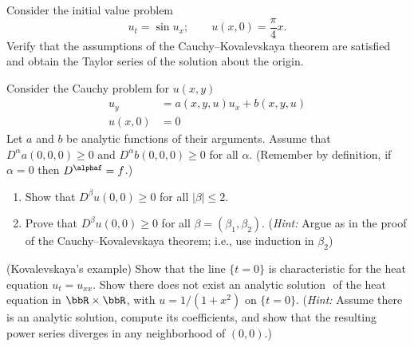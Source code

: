 \begin{problem}
  Consider the initial value problem
  \[
    u_t=\sin u_x;\qquad u(x,0)=\frac{\pi}{4}x.
  \]
  Verify that the assumptions of the Cauchy--Kovalevskaya theorem are
  satisfied and obtain the Taylor series of the solution about the origin.
\end{problem}
\begin{solution}
\end{solution}
\newpage

\begin{problem}
  Consider the Cauchy problem for \(u(x,y)\)
  \begin{align*}
    u_y&=a(x, y, u)u_x+b(x,y,u)\\
    u(x,0)&=0
  \end{align*}
  Let \(a\) and \(b\) be analytic functions of their arguments. Assume that
  \(D^\alpha a(0,0,0)\geq 0\) and \(D^\alpha b(0,0,0)\geq 0\) for all
  \(\alpha\). (Remember by definition, if \(\alpha=0\) then
  \(D^\alphaf=f\).)
  \begin{enumerate}[label=(\alph*),noitemsep]
  \item Show that \(D^\beta u(0,0)\geq 0\) for all \(|\beta|\leq 2\).
  \item Prove that \(D^\beta u(0,0)\geq 0\) for all
    \(\beta=(\beta_1,\beta_2)\). (\emph{Hint:} Argue as in the proof of the
    Cauchy--Kovalevskaya theorem; i.e., use induction in \(\beta_2\))
\end{enumerate}
\end{problem}
\begin{solution}
\end{solution}
\newpage

\begin{problem}
  (Kovalevskaya's example) Show that the line \(\{t=0\}\) is characteristic
  for the heat equation \(u_t=u_{xx}\). Show there does not exist an
  analytic solution \(\) of the heat equation in \(\bbR\times\bbR\), with
  \(u=1/(1+x^2)\) on \(\{t=0\}\). (\emph{Hint:} Assume there is an analytic
  solution, compute its coefficients, and show that the resulting power
  series diverges in any neighborhood of \((0,0)\).)
\end{problem}
\begin{solution}
\end{solution}

